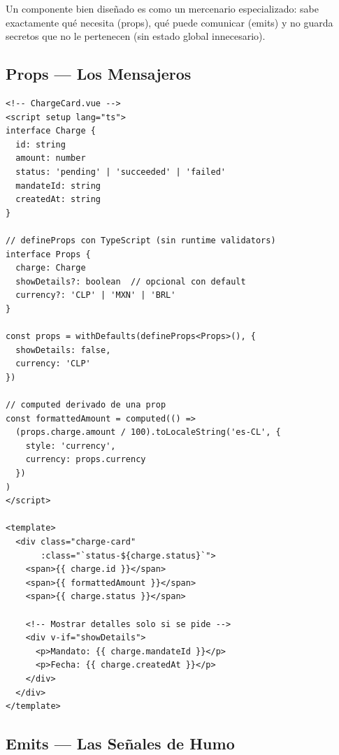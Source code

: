 \documentclass[11pt,a4paper]{article}
\begin{document}
\begin{lore}
Un componente bien diseñado es como un mercenario especializado: sabe
exactamente qué necesita (props), qué puede comunicar (emits) y no
guarda secretos que no le pertenecen (sin estado global innecesario).
\end{lore}

\subsection{Props — Los Mensajeros}

\begin{pergamino}
\begin{lstlisting}[style=vue]
<!-- ChargeCard.vue -->
<script setup lang="ts">
interface Charge {
  id: string
  amount: number
  status: 'pending' | 'succeeded' | 'failed'
  mandateId: string
  createdAt: string
}

// defineProps con TypeScript (sin runtime validators)
interface Props {
  charge: Charge
  showDetails?: boolean  // opcional con default
  currency?: 'CLP' | 'MXN' | 'BRL'
}

const props = withDefaults(defineProps<Props>(), {
  showDetails: false,
  currency: 'CLP'
})

// computed derivado de una prop
const formattedAmount = computed(() =>
  (props.charge.amount / 100).toLocaleString('es-CL', {
    style: 'currency',
    currency: props.currency
  })
)
</script>

<template>
  <div class="charge-card"
       :class="`status-${charge.status}`">
    <span>{{ charge.id }}</span>
    <span>{{ formattedAmount }}</span>
    <span>{{ charge.status }}</span>

    <!-- Mostrar detalles solo si se pide -->
    <div v-if="showDetails">
      <p>Mandato: {{ charge.mandateId }}</p>
      <p>Fecha: {{ charge.createdAt }}</p>
    </div>
  </div>
</template>
\end{lstlisting}
\end{pergamino}

\subsection{Emits — Las Señales de Humo}
\end{document}
